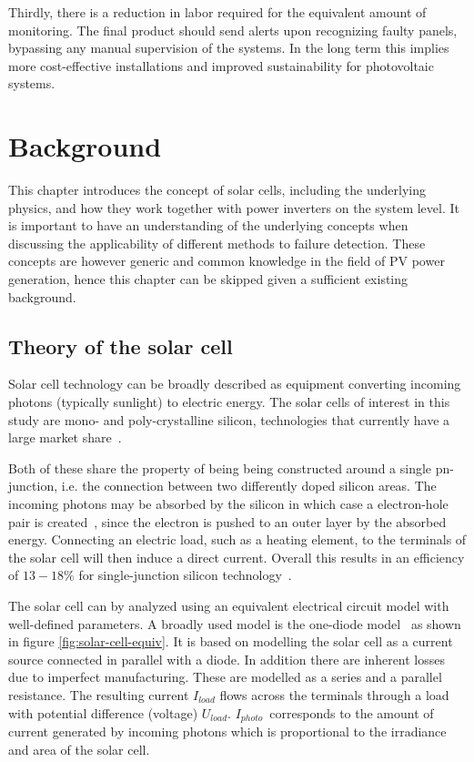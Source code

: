 Thirdly, there is a reduction in labor required for the equivalent amount of monitoring.
The final product should send alerts upon recognizing faulty panels, bypassing any manual supervision of the systems.
In the long term this implies more cost-effective installations and improved sustainability for photovoltaic systems.

\chapter{Background}
This chapter introduces the concept of solar cells, including the underlying physics,
and how they work together with power inverters on the system level.
It is important to have an understanding of the underlying concepts when discussing the applicability of different methods to failure detection.
These concepts are however generic and common knowledge in the field of PV power generation, 
hence this chapter can be skipped given a sufficient existing background.

\section{Theory of the solar cell}
Solar cell technology can be broadly described as equipment converting incoming photons (typically sunlight) to electric energy.
The solar cells of interest in this study are mono- and poly-crystalline silicon, technologies that currently have a large market share~\cite{Zhao2010thesis}.

Both of these share the property of being being constructed around a single pn-junction, i.e. the connection between two differently doped silicon areas.
The incoming photons may be absorbed by the silicon in which case a electron-hole pair is created~\cite{Zhao2010thesis}, since the electron is pushed to an outer layer by the absorbed energy.
Connecting an electric load, such as a heating element, to the terminals of the solar cell will then induce a direct current.
Overall this results in an efficiency of $13-18\%$ for single-junction silicon technology~\cite{Zhao2010thesis}.

The solar cell can by analyzed using an equivalent electrical circuit model with well-defined parameters.
A broadly used model is the one-diode model~\cite{Walker2001} as shown in figure \ref{fig:solar-cell-equiv}.
It is based on modelling the solar cell as a current source connected in parallel with a diode.
In addition there are inherent losses due to imperfect manufacturing.
These are modelled as a series and a parallel resistance.
The resulting current $I_{load}$ flows across the terminals through a load with potential difference (voltage) $U_{load}$.
$I_{photo}$ corresponds to the amount of current generated by incoming photons which is proportional to the irradiance and area of the solar cell.

